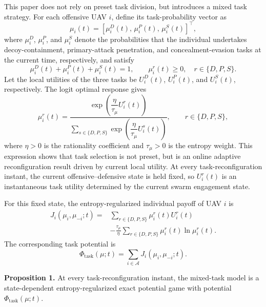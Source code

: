 \documentclass{cja}
\begin{document}
This paper does not rely on preset task division, but introduces a mixed task strategy. For each offensive UAV $i$, define its task-probability vector as
\begin{equation}
\mu_i(t)=
\left[
\mu_i^{D}(t),\,
\mu_i^{P}(t),\,
\mu_i^{S}(t)
\right]^{\top},
\end{equation}
where $\mu_i^{D}$, $\mu_i^{P}$, and $\mu_i^{S}$ denote the probabilities that the individual undertakes decoy-containment, primary-attack penetration, and concealment-evasion tasks at the current time, respectively, and satisfy
\begin{equation}
\mu_i^{D}(t)+\mu_i^{P}(t)+\mu_i^{S}(t)=1,\qquad
\mu_i^{r}(t)\ge 0,\quad r\in\{D,P,S\}.
\end{equation}
Let the local utilities of the three tasks be $U_i^{D}(t)$, $U_i^{P}(t)$, and $U_i^{S}(t)$, respectively. The logit optimal response gives
\begin{equation}
\mu_i^{r}(t)
=
\frac{\exp\!\left(\dfrac{\eta}{\tau_\mu}U_i^{r}(t)\right)}
{\sum\limits_{s\in\{D,P,S\}}\exp\!\left(\dfrac{\eta}{\tau_\mu}U_i^{s}(t)\right)},
\qquad r\in\{D,P,S\},
\label{eq:role-logit}
\end{equation}
where $\eta>0$ is the rationality coefficient and $\tau_\mu>0$ is the entropy weight. This expression shows that task selection is not preset, but is an online adaptive reconfiguration result driven by current local utility. At every task-reconfiguration instant, the current offensive--defensive state is held fixed, so $U_i^r(t)$ is an instantaneous task utility determined by the current swarm engagement state.

For this fixed state, the entropy-regularized individual payoff of UAV $i$ is
\begin{equation}
\begin{aligned}
J_i(\mu_i,\mu_{-i};t)
={}&
\sum_{r\in\{D,P,S\}}\mu_i^r(t)U_i^r(t)\\
&-\frac{\tau_\mu}{\eta}
\sum_{r\in\{D,P,S\}}\mu_i^r(t)\ln\mu_i^r(t).
\end{aligned}
\end{equation}
The corresponding task potential is
\begin{equation}
\Phi_{\mathrm{task}}(\mu;t)
=
\sum_{i\in\mathcal A}J_i(\mu_i,\mu_{-i};t).
\end{equation}

\noindent\textbf{Proposition 1.} At every task-reconfiguration instant, the mixed-task model is a state-dependent entropy-regularized exact potential game with potential $\Phi_{\mathrm{task}}(\mu;t)$.
\end{document}
